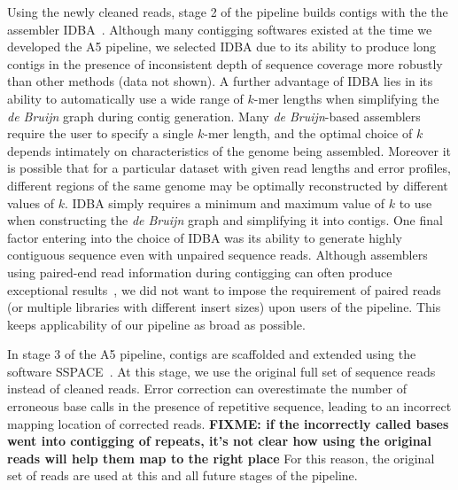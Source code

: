 \documentclass{bioinfo}
\begin{document}
\begin{methods}
Using the newly cleaned reads, stage 2 of the pipeline builds contigs
with the the assembler IDBA~\citep{Peng2010}. Although many contigging softwares existed at the time we developed the A5 pipeline, we selected IDBA due 
to its ability to produce long contigs in the presence of inconsistent depth of sequence coverage more robustly than other methods (data not shown).
A further advantage of IDBA lies in its ability to automatically use a wide range of $k$-mer lengths when simplifying the \emph{de Bruijn} graph during contig generation.
Many \emph{de Bruijn}-based assemblers require the user to specify a single $k$-mer length, and the optimal choice of $k$ depends intimately
on characteristics of the genome being assembled.  Moreover it is possible that for a particular dataset with given read lengths and error profiles, different regions of the same genome may be optimally reconstructed by different values of $k$. IDBA simply requires a minimum and maximum value of $k$ to
use when constructing the \emph{de Bruijn} graph and simplifying it into contigs. One final factor entering into the choice of IDBA was its ability to generate highly contiguous sequence even with unpaired sequence reads. Although assemblers using paired-end read information during contigging can often produce exceptional results~\citep{Gnerre2011, SASSY}, we did not want to impose the requirement of paired reads (or multiple libraries with different insert sizes) upon users of the pipeline. This keeps applicability of our pipeline as broad as possible.

In stage 3 of the A5 pipeline, contigs are scaffolded and extended using the software SSPACE~\citep{Boetzer2011}. At this stage, we use the original full set of sequence reads instead of cleaned reads. 
Error correction can overestimate the number of erroneous base calls in the presence of repetitive sequence, leading to an incorrect mapping location of corrected reads. \textbf{FIXME: if the incorrectly called bases went into contigging of repeats, it's not clear how using the original reads will help them map to the right place}  For this reason, the original set of reads are used at this and all future stages of the pipeline. 


\end{methods}
\end{document}
